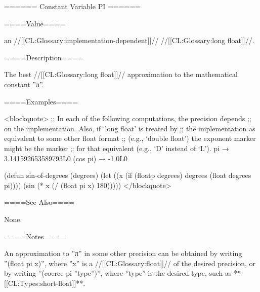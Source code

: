 ====== Constant Variable PI ======

====Value====

an //[[CL:Glossary:implementation-dependent]]// //[[CL:Glossary:long float]]//.

====Description====

The best //[[CL:Glossary:long float]]// approximation to the mathematical constant ''π''.

====Examples====

<blockquote> ;; In each of the following computations, the precision depends ;; on the implementation. Also, if `long float' is treated by ;; the implementation as equivalent to some other float format ;; (e.g., `double float') the exponent marker might be the marker ;; for that equivalent (e.g., `D' instead of `L'). pi → 3.141592653589793L0 (cos pi) → -1.0L0

(defun sin-of-degrees (degrees) (let ((x (if (floatp degrees) degrees (float degrees pi)))) (sin (* x (/ (float pi x) 180))))) </blockquote>

====See Also====

None.

====Notes====

An approximation to ''π'' in some other precision can be obtained by writing ''(float pi x)'', where ''x'' is a //[[CL:Glossary:float]]// of the desired precision, or by writing ''(coerce pi ''type'')'', where ''type'' is the desired type, such as **[[CL:Types:short-float]]**.

